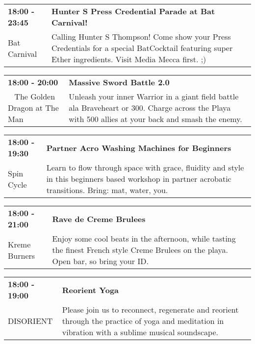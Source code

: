 \begin{tabular}{ p{1in} p{2.2in} }
    \textbf{18:00 - 23:45} & \textbf{Hunter S Press Credential Parade at Bat Carnival!} \\
    Bat Carnival \newline  & Calling Hunter S Thompson! Come show your Press Credentials for a special BatCocktail featuring super Ether ingredients. Visit Media Mecca first. ;) \\
    \hline 
\end{tabular}
    
\begin{tabular}{ p{1in} p{2.2in} }
    \textbf{18:00 - 20:00} & \textbf{Massive Sword Battle 2.0} \\
    ~ \newline The Golden Dragon at The Man & Unleash your inner Warrior in a giant field battle ala Braveheart or 300. Charge across the Playa with 500 allies at your back and smash the enemy. \\
    \hline 
\end{tabular}
    
\begin{tabular}{ p{1in} p{2.2in} }
    \textbf{18:00 - 19:30} & \textbf{Partner Acro Washing Machines for Beginners} \\
    Spin Cycle \newline  & Learn to flow through space with grace, fluidity and style in this beginners based workshop in partner acrobatic transitions. Bring: mat, water, you. \\
    \hline 
\end{tabular}
    
\begin{tabular}{ p{1in} p{2.2in} }
    \textbf{18:00 - 21:00} & \textbf{Rave de Creme Brulees} \\
    Kreme Burners \newline  & Enjoy some cool beats in the afternoon, while tasting the finest French style Creme Brulees on the playa. Open bar, so bring your ID. \\
    \hline 
\end{tabular}
    
\begin{tabular}{ p{1in} p{2.2in} }
    \textbf{18:00 - 19:00} & \textbf{Reorient Yoga} \\
    DISORIENT \newline  & Please join us to reconnect, regenerate and reorient through the practice of yoga and meditation in vibration with a sublime musical soundscape. \\
    \hline 
\end{tabular}
    

